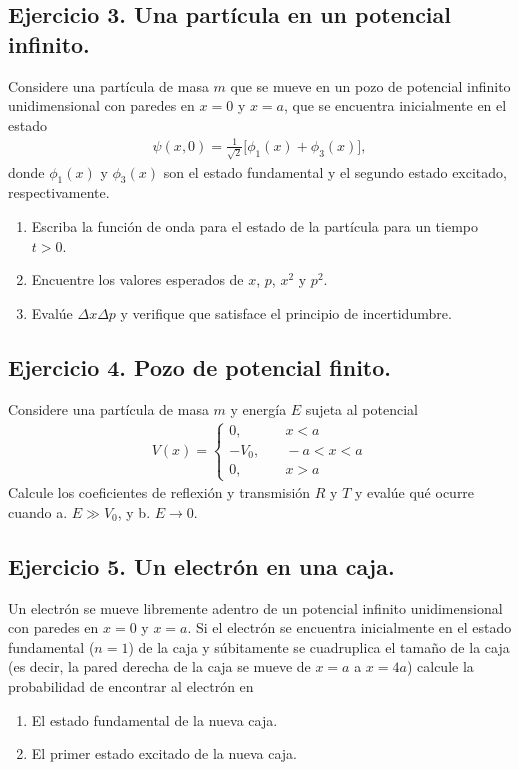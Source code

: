 \documentclass[11pt,letterpaper]{article}
\begin{document}
\subsection*{Ejercicio 3. Una partícula en un potencial infinito.}
Considere una partícula de masa $m$ que se mueve en un pozo de potencial infinito
unidimensional con paredes en $x=0$ y $x=a$, que se encuentra inicialmente en el 
estado 
\begin{align}
\psi(x,0)=\frac{1}{\sqrt{2}}\big[\phi_1(x)+\phi_3(x) \big],
\end{align}
donde $\phi_1(x)$ y $\phi_3(x)$ son el estado fundamental y el segundo estado 
excitado, respectivamente. 
\begin{enumerate}
\item Escriba la función de onda para el estado de la partícula para un tiempo 
$t>0$. 
\item Encuentre los valores esperados de $x$, $p$, $x^2$ y $p^2$.
\item Evalúe $\Delta x\Delta p$ y verifique que satisface el principio de incertidumbre.
\end{enumerate}

\subsection*{Ejercicio 4. Pozo de potencial finito.}
Considere una partícula de masa $m$ y energía $E$ sujeta al potencial 
\begin{align}
V(x)= \left\{ \begin{array}{rl}
             0, &   \quad x<a \\
             -V_0, &  \quad -a<x<a\\
             0,	   &  \quad x>a
             \end{array}
   \right.
\end{align}
Calcule los coeficientes de reflexión y transmisión $R$ y $T$ y evalúe 
qué ocurre cuando a. $E\gg V_0$, y b. $E\to 0$.

\subsection*{Ejercicio 5. Un electrón en una caja.}
Un electrón se mueve libremente adentro de un potencial infinito unidimensional 
con paredes en $x=0$ y $x=a$. Si el electrón se encuentra inicialmente en el 
estado fundamental ($n=1$) de la caja y súbitamente se cuadruplica el tamaño
de la caja (es decir, la pared derecha de la caja se mueve de $x=a$ a $x=4a$)
calcule la probabilidad de encontrar al electrón en
\begin{enumerate}
\item El estado fundamental de la nueva caja. 
\item El primer estado excitado de la nueva caja. 
\end{enumerate}
\end{document}
